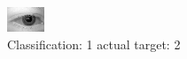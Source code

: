 \begin{figure}[h!]
\begin{center}
\includegraphics[width=0.60\columnwidth]{figures/ID443_class_1_target_2.png}
\end{center}
\caption{ Classification: 1 actual target: 2}
\label{fig:ID443_class_1_target_2}
\end{figure}
